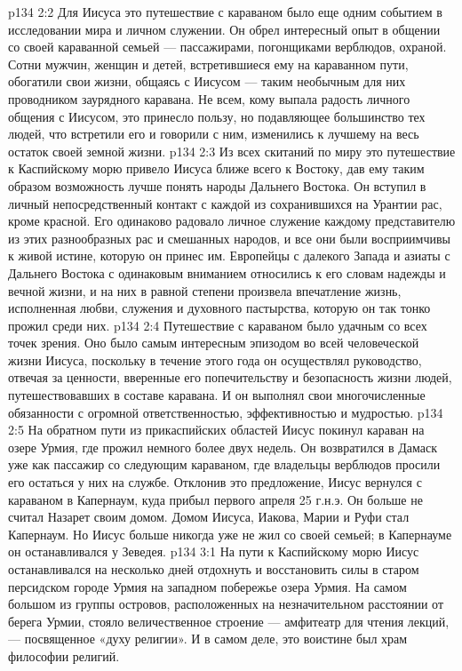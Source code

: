 \vs p134 2:2 Для Иисуса это путешествие с караваном было еще одним событием в исследовании мира и личном служении. Он обрел интересный опыт в общении со своей караванной семьей --- пассажирами, погонщиками верблюдов, охраной. Сотни мужчин, женщин и детей, встретившиеся ему на караванном пути, обогатили свои жизни, общаясь с Иисусом --- таким необычным для них проводником заурядного каравана. Не всем, кому выпала радость личного общения с Иисусом, это принесло пользу, но подавляющее большинство тех людей, что встретили его и говорили с ним, изменились к лучшему на весь остаток своей земной жизни.
\vs p134 2:3 Из всех скитаний по миру это путешествие к Каспийскому морю привело Иисуса ближе всего к Востоку, дав ему таким образом возможность лучше понять народы Дальнего Востока. Он вступил в личный непосредственный контакт с каждой из сохранившихся на Урантии рас, кроме красной. Его одинаково радовало личное служение каждому представителю из этих разнообразных рас и смешанных народов, и все они были восприимчивы к живой истине, которую он принес им. Европейцы с далекого Запада и азиаты с Дальнего Востока с одинаковым вниманием относились к его словам надежды и вечной жизни, и на них в равной степени произвела впечатление жизнь, исполненная любви, служения и духовного пастырства, которую он так тонко прожил среди них.
\vs p134 2:4 \pc Путешествие с караваном было удачным со всех точек зрения. Оно было самым интересным эпизодом во всей человеческой жизни Иисуса, поскольку в течение этого года он осуществлял руководство, отвечая за ценности, вверенные его попечительству и безопасность жизни людей, путешествовавших в составе каравана. И он выполнял свои многочисленные обязанности с огромной ответственностью, эффективностью и мудростью.
\vs p134 2:5 На обратном пути из прикаспийских областей Иисус покинул караван на озере Урмия, где прожил немного более двух недель. Он возвратился в Дамаск уже как пассажир со следующим караваном, где владельцы верблюдов просили его остаться у них на службе. Отклонив это предложение, Иисус вернулся с караваном в Капернаум, куда прибыл первого апреля 25 г.н.э. Он больше не считал Назарет своим домом. Домом Иисуса, Иакова, Марии и Руфи стал Капернаум. Но Иисус больше никогда уже не жил со своей семьей; в Капернауме он останавливался у Зеведея.
\vs p134 3:1 На пути к Каспийскому морю Иисус останавливался на несколько дней отдохнуть и восстановить силы в старом персидском городе Урмия на западном побережье озера Урмия. На самом большом из группы островов, расположенных на незначительном расстоянии от берега Урмии, стояло величественное строение --- амфитеатр для чтения лекций, --- посвященное «духу религии». И в самом деле, это воистине был храм философии религий.
